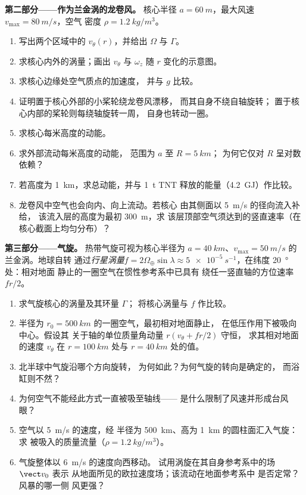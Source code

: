 \begin{problem}
\medskip
\noindent\textbf{第二部分——作为兰金涡的龙卷风。}
核心半径 $a = \qty{60}{m}$，最大风速 $v_{\max} = \qty{80}{m/s}$，空气
密度 $\rho = \qty{1.2}{kg/m^3}$。
\begin{enumerate}[resume]
  \item 写出两个区域中的 $v_\theta(r)$，并给出 $\Omega$ 与 $\Gamma$。
  \item 求核心内外的涡量；画出 $v_\theta$ 与 $\omega_z$
        随 $r$ 变化的示意图。
  \item 求核心边缘处空气质点的加速度，
        并与 $g$ 比较。
  \item 证明置于核心外部的小桨轮绕龙卷风漂移，
        而其自身不绕自轴旋转；
        置于核心内部的桨轮则每绕轴旋转一周，
        自身也转动一圈。
  \item 求核心每米高度的动能。
  \item 求外部流动每米高度的动能，
        范围为 $a$ 至 $R = \qty{5}{km}$；
        为何它仅对 $R$ 呈对数依赖？
  \item 若高度为 \qty{1}{km}，求总动能，并与
        \qty{1}{t} TNT 释放的能量（\qty{4.2}{GJ}）作比较。
  \item 龙卷风中空气也会向内、向上流动。若核心
        由其侧面以 \qty{5}{m/s} 的径向流入补给，
        该流入层的高度为最初 \qty{300}{m}，求
        该层顶部空气须达到的竖直速率（在
        核心截面上均匀分布）？
\end{enumerate}

\medskip
\noindent\textbf{第三部分——气旋。}
热带气旋可视为核心半径为
$a = \qty{40}{km}$、$v_{\max} = \qty{50}{m/s}$ 的兰金涡。地球自转
通过\emph{行星涡量}$f = 2\Omega_\oplus\sin\lambda
\approx \qty{5e-5}{s^{-1}}$，在纬度 \qty{20}{\degree} 处：相对地面
静止的一圈空气在惯性参考系中已具有
绕任一竖直轴的方位速率 $fr/2$。
\begin{enumerate}[resume]
  \item 求气旋核心的涡量及其环量 $\Gamma$；
        将核心涡量与 $f$ 作比较。
  \item 半径为 $r_0 = \qty{500}{km}$ 的一圈空气，最初相对地面静止，
        在低压作用下被吸向中心。假设其
        关于轴的单位质量角动量 $r(v_\theta + fr/2)$ 守恒，
        求其相对地面的速度
        $v_\theta$ 在 $r = \qty{100}{km}$ 处与
        $r = \qty{40}{km}$ 处的值。
  \item 北半球中气旋沿哪个方向旋转，
        为何如此？为何气旋的转向是确定的，
        而浴缸则不然？
  \item 为何空气不能经此方式一直被吸至轴线——
        是什么限制了风速并形成台风眼？
  \item 空气以 \qty{5}{m/s} 的速度，经
        半径为 \qty{500}{km}、高为 \qty{1}{km} 的圆柱面汇入气旋：求
        被吸入的质量流量（$\rho = \qty{1.2}{kg/m^3}$）。
  \item 气旋整体以 \qty{6}{m/s} 的速度向西移动。
        试用涡旋在其自身参考系中的场 $\vect v_0$ 表示
        从地面所见的欧拉速度场；该流动在地面参考系中
        是否定常？风暴的哪一侧
        风更强？
\end{enumerate}


\end{problem}
